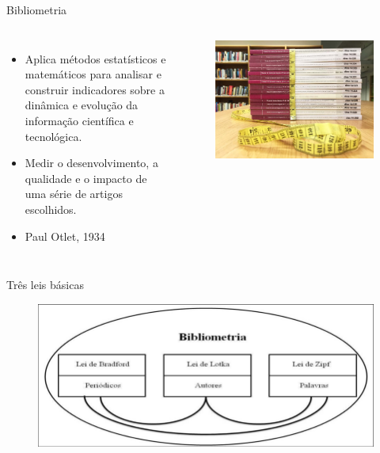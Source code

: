 \begin{frame}{Bibliometria}
	\begin{columns}
		\begin{itemize}
			\item Aplica métodos estatísticos e matemáticos para analisar e construir indicadores sobre a dinâmica e evolução da informação científica e tecnológica.
			\item Medir o desenvolvimento, a qualidade e o impacto de uma série de artigos escolhidos.
			\item Paul Otlet, 1934
		\end{itemize}
		\begin{figure}[hb]
			\includegraphics[width=1\textwidth]{figures/bibliometria.jpg}
		\end{figure}
	\end{columns}
\end{frame}

\begin{frame}{Três leis básicas}
	\begin{figure}[hb]
		\includegraphics[width=1\textwidth]{figures/leisbibliometria.png}
	\end{figure}
\end{frame}

